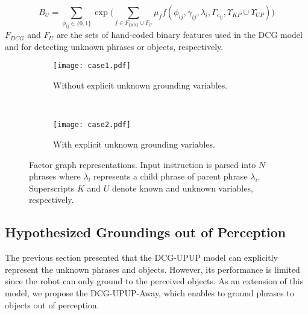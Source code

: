 \begin{equation}
B_U= \sum_{\phi_{ij} \in \{0,1\}}\exp \Big( \sum_{f \in F_{\text{DCG}} \cup F_U} \mu_f f(\phi_{ij},\gamma_{ij},\lambda_i,\Gamma_{c_{ij}},\Upsilon_{KP} \cup \Upsilon_{UP}) \Big) \nonumber
\end{equation}
$F_{DCG}$ and $F_{U}$ are the sets of hand-coded binary features used in the DCG model and for detecting unknown phrases or objects, respectively.
\begin{figure}
\centering
\begin{subfigure}[t]{0.45\columnwidth}
\centering
\texttt{[image: case1.pdf]}
\caption{Without explicit unknown grounding variables.}
\label{fig:wo_unknown}
\end{subfigure}
~
\begin{subfigure}[t]{0.51\columnwidth}
\centering
\texttt{[image: case2.pdf]}
\caption{With explicit unknown grounding variables.}
\label{fig:w_unknown}
\end{subfigure}

\caption{Factor graph representations. Input instruction is parsed into $N$ phrases where $\lambda_l$ represents a child phrase of parent phrase $\lambda_i$. Superscripts $K$ and $U$ denote known and unknown variables, respectively.}
\end{figure}

\subsection{Hypothesized Groundings out of Perception}
The previous section presented that the DCG-UPUP model can explicitly represent the unknown phrases and objects. However, its performance is limited since the robot can only ground to the perceived objects. As an extension of this model, we propose the DCG-UPUP-Away, which enables to ground phrases to objects out of perception.

